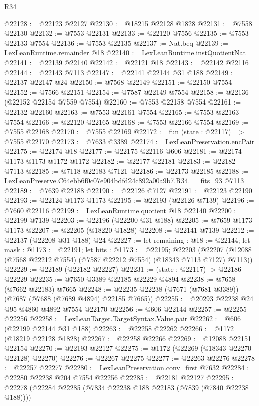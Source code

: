 \begin{lexlean}{R34}
\begin{coremodule}
@22128 := @22123 @22127
@22130 := @18215 @22128 @1828
@22131 := @7558 @22130
@22132 := @7553 @22131
@22133 := @22120 @7556
@22135 := @7553 @22133 @7554
@22136 := @7553 @22135
@22137 := Nat.beq
@22139 := LexLeanRuntime.remainder @18
@22140 := LexLeanRuntime.instQuotientNat
@22141 := @22139 @22140
@22142 := @22121 @18
@22143 := @22142 @22116
@22144 := @22143 @7113
@22147 := @22141 @22144 @31 @188
@22149 := @22137 @22147 @24
@22150 := @7568 @22149
@22151 := @22150 @7554
@22152 := @7566 @22151
@22154 := @7587 @22149 @7554
@22158 := @22136 (@22152 @22154 @7559 @7554)
@22160 := @7553 @22158 @7554
@22161 := @22132 @22160
@22163 := @7553 @22161 @7554
@22165 := @7553 @22163 @7554
@22166 := @22120 @22165
@22168 := @7553 @22166 @7554
@22169 := @7555 @22168
@22170 := @7555 @22169
@22172 := fun (state : @22117) => @7555 @22170
@22173 := @7633 @3389
@22174 := LexLeanPreservation.encPair
@22175 := @22174 @18
@22177 := @22175 @22116 @606
@22181 := @22174 @1173 @1173 @1172 @1172
@22182 := @22177 @22181
@22183 := @22182 @7113
@22185 := @7118 @22183 @7121
@22186 := @22173 @22185
@22188 := LexLeanPreserve.C64ebb6f0c07e904bdfd24c892a00a9b7.R34.__fits_93 @7113
@22189 := @7639 @22188
@22190 := @22126 @7127
@22191 := @22123 @22190
@22193 := @22124 @1173 @1173
@22195 := @22193 (@22126 @7139)
@22196 := @7660 @22116
@22199 := LexLeanRuntime.quotient @18 @22140
@22200 := @22199 @7139
@22203 := @22196 (@22200 @31 @188)
@22205 := @7659 @1173 @1173
@22207 := @22205 (@18220 @1828)
@22208 := @22141 @7139
@22212 := @22137 (@22208 @31 @188) @24
@22227 := let remaining : @18 := @22144;
  let mask : @1173 := @22191;
  let bits : @1173 := @22195;
  @22203 (@22207 (@12088 (@7568 @22212 @7554) (@7587 @22212 @7554) (@18343 @7113 @7127) @7113))
@22229 := @22189 (@22182 @22227)
@22231 := (state : @22117) -> @22186 @22229
@22235 := @7650 @3389 @22185 @22229 @4894
@22238 := @7658 (@7662 @22183) @7665
@22248 := @22235 @22238 (@7671 (@7681 @3389)) (@7687 (@7688 (@7689 @4894) @22185 @7665))
@22255 := @20293 @22238 @24 @95 @4860 @4892 @7554 @22170
@22256 := @606 @22144
@22257 := @22255 @22256
@22258 := LexLeanTarget.TargetSyntax.Value.pair
@22262 := @606 (@22199 @22144 @31 @188)
@22263 := @22258 @22262
@22266 := @1172 (@18219 @22128 @1828)
@22267 := @22258 @22266
@22269 := @12088 @22151 @22154
@22270 := @22193 @22127
@22275 := @1172 (@22269 (@18343 @22270 @22128) @22270)
@22276 := @22267 @22275
@22277 := @22263 @22276
@22278 := @22257 @22277
@22280 := LexLeanPreservation.conv_first @7632
@22284 := @22280 @22238 @204 @7554 @22256
@22285 := @22181 @22127
@22295 := @22278 (@22284 @22285 (@7834 @22238 @188 @22183 (@7839 (@7840 @22238 @188))))

\end{coremodule}
\end{lexlean}
